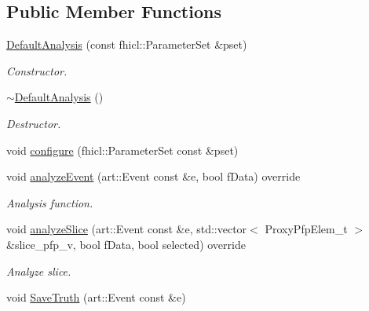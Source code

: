 \subsection*{Public Member Functions}
\begin{DoxyCompactItemize}
\item 
\hyperlink{classanalysis_1_1DefaultAnalysis_a857349701c91ee06075ea01c5edc15b6}{Default\+Analysis} (const fhicl\+::\+Parameter\+Set \&pset)
\begin{DoxyCompactList}\small\item\em Constructor. \end{DoxyCompactList}\item 
\hyperlink{classanalysis_1_1DefaultAnalysis_ad4be6c0a18f97e1d02a5c1e905ac5786}{$\sim$\+Default\+Analysis} ()\hypertarget{classanalysis_1_1DefaultAnalysis_ad4be6c0a18f97e1d02a5c1e905ac5786}{}\label{classanalysis_1_1DefaultAnalysis_ad4be6c0a18f97e1d02a5c1e905ac5786}

\begin{DoxyCompactList}\small\item\em Destructor. \end{DoxyCompactList}\item 
void \hyperlink{classanalysis_1_1DefaultAnalysis_a475f62ff6b6dae44bb4f3c917f0970de}{configure} (fhicl\+::\+Parameter\+Set const \&pset)
\item 
void \hyperlink{classanalysis_1_1DefaultAnalysis_a0cf6d593602ba67c23fae67ca7989c10}{analyze\+Event} (art\+::\+Event const \&e, bool f\+Data) override
\begin{DoxyCompactList}\small\item\em Analysis function. \end{DoxyCompactList}\item 
void \hyperlink{classanalysis_1_1DefaultAnalysis_ad676faeeb49900efb0c9a615a60d179c}{analyze\+Slice} (art\+::\+Event const \&e, std\+::vector$<$ Proxy\+Pfp\+Elem\+\_\+t $>$ \&slice\+\_\+pfp\+\_\+v, bool f\+Data, bool selected) override\hypertarget{classanalysis_1_1DefaultAnalysis_ad676faeeb49900efb0c9a615a60d179c}{}\label{classanalysis_1_1DefaultAnalysis_ad676faeeb49900efb0c9a615a60d179c}

\begin{DoxyCompactList}\small\item\em Analyze slice. \end{DoxyCompactList}\item 
void \hyperlink{classanalysis_1_1DefaultAnalysis_a5d973c6b88477330f6b744f3c9c60dd6}{Save\+Truth} (art\+::\+Event const \&e)\hypertarget{classanalysis_1_1DefaultAnalysis_a5d973c6b88477330f6b744f3c9c60dd6}{}\label{classanalysis_1_1DefaultAnalysis_a5d973c6b88477330f6b744f3c9c60dd6}


\end{DoxyCompactItemize}
